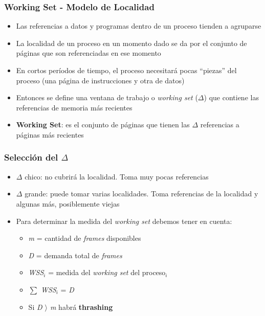 \begin{frame}
  \frametitle{Working Set - \textbf{Modelo de Localidad}}
  \begin{itemize}
  	\item Las referencias a datos y programas dentro de un proceso tienden a agruparse
  	\item La localidad de un proceso en un momento dado se da por el conjunto de páginas que son referenciadas en ese momento
  	\item En cortos períodos de tiempo, el proceso necesitará pocas ``piezas'' del proceso (una página de instrucciones y otra de datos)
  	\item Entonces se define una ventana de trabajo o \emph{working set} ($\Delta$) que contiene las referencias de memoria más recientes
  	\item \textbf{Working Set}: es el conjunto de páginas que tienen las $\Delta$ referencias a páginas más recientes
  \end{itemize}
\end{frame}

\begin{frame}
  \frametitle{Selección del $\Delta$}
  \begin{itemize}
    \item $\Delta$ chico: no cubrirá la localidad. Toma muy pocas referencias
    \item $\Delta$ grande: puede tomar varias localidades. Toma referencias de la localidad y algunas más, posiblemente viejas
    \item Para determinar la medida del \emph{working set} debemos tener en cuenta:
    \begin{itemize}
      \item \emph{m} = cantidad de \emph{frames} disponibles
      \item \emph{D} = demanda total de \emph{frames}
      \item \emph{WSS$_i$} = medida del \emph{working set} del proceso$_i$
      \item \emph{$\sum$ WSS$_i$} = \emph{D}
      \item Si \emph{D $\rangle$ m} habrá \textbf{thrashing}
    \end{itemize}    
  \end{itemize}
\end{frame}


